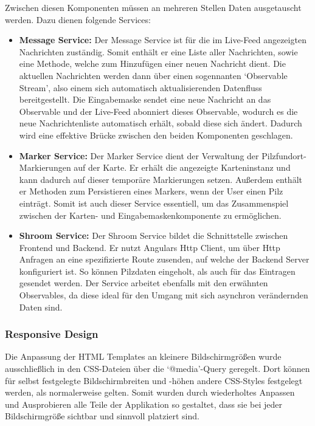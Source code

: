 \documentclass[../main.tex]{subfiles}
\begin{document}
Zwischen diesen Komponenten müssen an mehreren Stellen Daten ausgetauscht werden. Dazu dienen folgende Services:

\begin{itemize}

	\item \textbf{Message Service:}
	      Der Message Service ist für die im Live-Feed angezeigten Nachrichten zuständig. Somit enthält er eine Liste aller Nachrichten, sowie eine Methode,
	      welche zum Hinzufügen einer neuen Nachricht dient. Die aktuellen Nachrichten werden dann über einen sogennanten `Observable Stream', also einem
	      sich automatisch aktualisierenden Datenfluss bereitgestellt. Die Eingabemaske sendet eine neue Nachricht an das Observable und der Live-Feed
	      abonniert dieses Observable, wodurch es die neue Nachrichtenliste automatisch erhält, sobald diese sich ändert. Dadurch wird eine effektive
	      Brücke zwischen den beiden Komponenten geschlagen.

	\item \textbf{Marker Service:}
	      Der Marker Service dient der Verwaltung der Pilzfundort-Markierungen auf der Karte. Er erhält die angezeigte Karteninstanz und kann dadurch auf
	      dieser temporäre Markierungen setzen. Außerdem enthält er Methoden zum Persistieren eines Markers, wenn der User einen Pilz einträgt. Somit ist
	      auch dieser Service essentiell, um das Zusammenspiel zwischen der Karten- und Eingabemaskenkomponente zu ermöglichen.

	\item \textbf{Shroom Service:}
	      Der Shroom Service bildet die Schnittstelle zwischen Frontend und Backend. Er nutzt Angulars Http Client, um über Http Anfragen an eine spezifizierte
	      Route zusenden, auf welche der Backend Server konfiguriert ist. So können Pilzdaten eingeholt, als auch für das Eintragen gesendet werden. Der Service
	      arbeitet ebenfalls mit den erwähnten Observables, da diese ideal für den Umgang mit sich asynchron verändernden Daten sind.

\end{itemize}

\subsubsection{Responsive Design}

Die Anpassung der HTML Templates an kleinere Bildschirmgrößen wurde ausschließlich in den CSS-Dateien über die `@media'-Query geregelt. Dort können für
selbst festgelegte Bildschirmbreiten und -höhen andere CSS-Styles festgelegt werden, als normalerweise gelten. Somit wurden durch wiederholtes Anpassen
und Ausprobieren alle Teile der Applikation so gestaltet, dass sie bei jeder Bildschirmgröße sichtbar und sinnvoll platziert sind.
\end{document}
